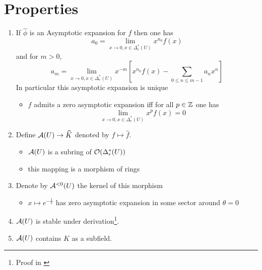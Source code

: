 \section{Properties}
\begin{enumerate}
  \item If $\hat\phi$ is an Asymptotic expansion for $f$ then one has
    \[
      a_0=\lim_{x\to 0,x\in\Delta_r^*(U)}x^{n_0}f(x)
    \]
    and for $m>0$,
    \[
      a_m=\lim_{x\to 0,x\in\Delta_r^*(U)}x^{-m}
        \left[x^{n_0}f(x)-\sum_{0\leq n\leq m-1}a_nx^n\right]
    \]
    In particular this asymptotic expansion is unique
    \begin{itemize}
      \item $f$ admits a zero asymptotic expansion iff for all $p\in\mathbb{Z}$
        one has
        \[
          \lim_{x\to 0,x\in\Delta_r^*(U)}x^pf(x)=0
        \]
    \end{itemize}
  \item
    Define $\mathcal{A}(U)\to \widehat K$ denoted by $f\mapsto \hat{f}$.
    \begin{itemize}
      \item $\mathcal{A}(U)$ is a subring of $\mathcal{O}(\Delta_r^*(U))$
      \item this mapping is a morphism of rings
    \end{itemize}
  \item Denote by $\mathcal{A}^{<0}(U)$ the kernel of this morphism
    \begin{itemize}
      \item $x\mapsto e^{-\frac{1}{x}}$ has zero asymptotic expansion in
        some sector around $\theta=0$
    \end{itemize}
  \item $\mathcal{A}(U)$ is stable under derivation\footnote{Proof in
    \cite{sabbah_cimpa90}}.
  \item $\mathcal{A}(U)$ contains $K$ as a subfield.
\end{enumerate}

